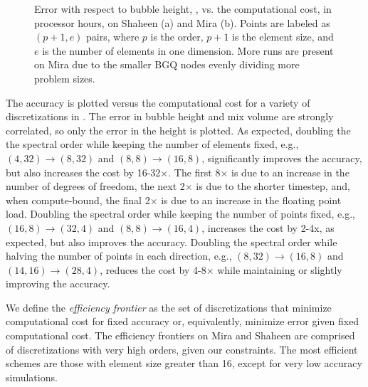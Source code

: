 \begin{figure}


\caption{ 
Error with respect to bubble height, , vs. the computational cost, in processor hours, on Shaheen (a) and Mira (b).
Points are labeled as $(p+1, e)$ pairs, where $p$ is the order, $p+1$ is the element size, and $e$ is the number of elements in one dimension.
More runs are present on Mira due to the smaller BGQ nodes evenly dividing more problem sizes.
}
\end{figure}

The accuracy is plotted versus the computational cost for a variety of discretizations in .
The error in bubble height and mix volume are strongly correlated, so only the error in the height is plotted.
As expected, doubling the the spectral order while keeping the number of elements fixed, e.g., $(4,32) \rightarrow (8,32)$ and $(8,8) \rightarrow (16,8)$, significantly improves the accuracy, but also increases the cost by 16-32$\times$.
The first 8$\times$ is due to an increase in the number of degrees of freedom, the next 2$\times$ is due to the shorter timestep, and, when compute-bound, the final 2$\times$ is due to an increase in the floating point load.
Doubling the spectral order while keeping the number of points fixed, e.g., $(16, 8) \rightarrow (32,4)$  and $(8,8) \rightarrow (16,4)$, increases the cost by 2-4x, as expected, but also improves the accuracy.
Doubling the spectral order while halving the number of points in each direction, e.g., $(8,32) \rightarrow (16,8)$ and $(14, 16) \rightarrow (28, 4)$, reduces the cost by 4-8$\times$ while maintaining or slightly improving the accuracy.

We define the \emph{efficiency frontier} as the set of discretizations that minimize computational cost for fixed accuracy or, equivalently, minimize error given fixed computational cost.
The efficiency frontiers on Mira and Shaheen are comprised of discretizations with very high orders, given our constraints.
The most efficient schemes are those with element size greater than 16, except for very low accuracy simulations.

